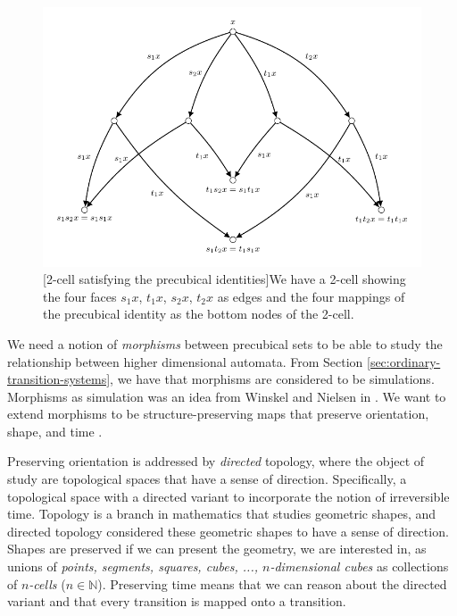     \begin{figure}[ht]
        \centering
        \includegraphics[scale=1]{Figures/3.An-introduction-to-non-interleaving-models-for-concurrency/precubical-square/cubical-law-2-cell-preidentity.pdf}
         [2-cell satisfying the precubical identities]{We have a 2-cell showing the four faces $s_1 x$, $t_1 x$, $s_2 x$, $t_2 x$ as edges and the four mappings of the precubical identity as the bottom nodes of the 2-cell.}
        \label{fig:precubical-set-interleaving-square-preidentity}
    \end{figure}
    
    We need a notion of \emph{morphisms} between precubical sets to be able to study the relationship between higher dimensional automata. From Section \ref{sec:ordinary-transition-systems}, we have that morphisms are considered to be simulations. Morphisms as simulation was an idea from Winskel and Nielsen in \cite{winskel95modelsCategory}. We want to extend morphisms to be structure-preserving maps that preserve orientation, shape, and time \cite[Section 2.2]{Goubault95PhDThesis}.
    
    Preserving orientation is addressed by \emph{directed} topology, where the object of study are topological spaces that have a sense of direction. Specifically, a topological space with a directed variant to incorporate the notion of irreversible time. Topology is a branch in mathematics that studies geometric shapes, and directed topology considered these geometric shapes to have a sense of direction. Shapes are preserved if we can present the geometry, we are interested in, as unions of \emph{points, segments, squares, cubes, ..., $n$-dimensional cubes} as collections of \emph{$n$-cells} ($n \in \mathbb{N}$). Preserving time means that we can reason about the directed variant and that every transition is mapped onto a transition.
    
